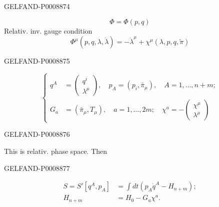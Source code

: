 \begin{GelfandAdjacentEvidence}{GELFAND-P000887}{4}

\begin{equation*}
\Phi=\Phi(p,q)
\end{equation*}
Relativ. inv. gauge condition
\begin{equation*}
\Phi^\mu(p,q,\lambda,\dot\lambda)=-\dot\lambda^\mu+\chi^\mu(\lambda,p,q,\tilde\pi)
\tag{5}
\end{equation*}
\end{GelfandAdjacentEvidence}
\begin{GelfandAdjacentEvidence}{GELFAND-P000887}{5}

\begin{equation*}
\left\{\begin{aligned}
q^A&=\begin{pmatrix}q^i\\\lambda^\mu\end{pmatrix},\quad p_A=(p_i,\bar\pi_\mu),\quad A=1,\ldots,n+m;\\
G_a&=(\bar\pi_\mu,T_\mu),\quad a=1,\ldots,2m;\quad\chi^a=-\begin{pmatrix}\chi^\mu\\\lambda^\mu\end{pmatrix}
\end{aligned}\right.
\tag{6}
\end{equation*}
\end{GelfandAdjacentEvidence}
\begin{GelfandAdjacentEvidence}{GELFAND-P000887}{6}


This is relativ. phase space. Then
\end{GelfandAdjacentEvidence}
\begin{GelfandAdjacentEvidence}{GELFAND-P000887}{7}

\begin{equation*}
\begin{aligned}
S=S'[q^A,p_A]&=\int dt(p_A\dot q^A-H_{n+m});\\
H_{n+m}&=H_0-G_a\chi^a.
\end{aligned}
\tag{7}
\end{equation*}
\end{GelfandAdjacentEvidence}
